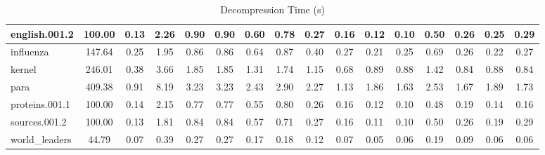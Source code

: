 \begin{table}[]
\begin{tabular}{|l|c|c|c|c|c|c|c|c|c|c|c|c|c|c|c|}
\hline
english.001.2 & 100.00 & 0.13 & 2.26 & 0.90 & 0.90 & 0.60 & 0.78 & 0.27 & 0.16 & 0.12 & 0.10 & 0.50 & 0.26 & 0.25 & 0.29 \\
\hline
influenza & 147.64 & 0.25 & 1.95 & 0.86 & 0.86 & 0.64 & 0.87 & 0.40 & 0.27 & 0.21 & 0.25 & 0.69 & 0.26 & 0.22 & 0.27 \\
\hline
kernel & 246.01 & 0.38 & 3.66 & 1.85 & 1.85 & 1.31 & 1.74 & 1.15 & 0.68 & 0.89 & 0.88 & 1.42 & 0.84 & 0.88 & 0.84 \\
\hline
para & 409.38 & 0.91 & 8.19 & 3.23 & 3.23 & 2.43 & 2.90 & 2.27 & 1.13 & 1.86 & 1.63 & 2.53 & 1.67 & 1.89 & 1.73 \\
\hline
proteins.001.1 & 100.00 & 0.14 & 2.15 & 0.77 & 0.77 & 0.55 & 0.80 & 0.26 & 0.16 & 0.12 & 0.10 & 0.48 & 0.19 & 0.14 & 0.16 \\
\hline
sources.001.2 & 100.00 & 0.13 & 1.81 & 0.84 & 0.84 & 0.57 & 0.71 & 0.27 & 0.16 & 0.11 & 0.10 & 0.50 & 0.26 & 0.19 & 0.29 \\
\hline
world\_leaders & 44.79 & 0.07 & 0.39 & 0.27 & 0.27 & 0.17 & 0.18 & 0.12 & 0.07 & 0.05 & 0.06 & 0.19 & 0.09 & 0.06 & 0.06 \\
\hline
\end{tabular}
\caption{Decompression Time (s)}
\label{tab:decompression_time}
\end{table}
